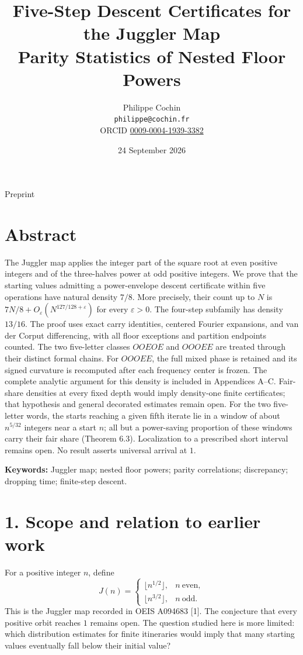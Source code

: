 \documentclass[11pt,a4paper]{article}
\title{Five-Step Descent Certificates for the Juggler
Map\\[0.4em]{\large Parity Statistics of Nested Floor Powers}}
\author{Philippe Cochin\\\small\texttt{philippe@cochin.fr}\\
  \small ORCID \href{https://orcid.org/0009-0004-1939-3382}{0009-0004-1939-3382}}
\date{24 September 2026}
\begin{document}
\maketitle
\begin{center}\small Preprint\end{center}
\section{Abstract}\label{abstract}

The Juggler map applies the integer part of the square root at even
positive integers and of the three-halves power at odd positive
integers. We prove that the starting values admitting a power-envelope
descent certificate within five operations have natural density \(7/8\).
More precisely, their count up to \(N\) is
\(7N/8+O_\varepsilon(N^{127/128+\varepsilon})\) for every
\(\varepsilon>0\). The four-step subfamily has density \(13/16\). The
proof uses exact carry identities, centered Fourier expansions, and van
der Corput differencing, with all floor exceptions and partition
endpoints counted. The two five-letter classes \(OOEOE\) and \(OOOEE\)
are treated through their distinct formal chains. For \(OOOEE\), the
full mixed phase is retained and its signed curvature is recomputed
after each frequency center is frozen. The complete analytic argument
for this density is included in Appendices A--C. Fair-share densities at
every fixed depth would imply density-one finite certificates; that
hypothesis and general decorated estimates remain open. For the two
five-letter words, the starts reaching a given fifth iterate lie in a
window of about \(n^{5/32}\) integers near a start \(n\); all but a
power-saving proportion of these windows carry their fair share (Theorem
6.3). Localization to a prescribed short interval remains open. No
result asserts universal arrival at \(1\).

\textbf{Keywords:} Juggler map; nested floor powers; parity
correlations; discrepancy; dropping time; finite-step descent.

\section{1. Scope and relation to earlier
work}\label{scope-and-relation-to-earlier-work}

For a positive integer \(n\), define \[
J(n)=
\begin{cases}
\lfloor n^{1/2}\rfloor,&n\ \text{even},\\
\lfloor n^{3/2}\rfloor,&n\ \text{odd}.
\end{cases}
\] This is the Juggler map recorded in OEIS A094683 {[}1{]}. The
conjecture that every positive orbit reaches \(1\) remains open. The
question studied here is more limited: which distribution estimates for
finite itineraries would imply that many starting values eventually fall
below their initial value?
\end{document}
